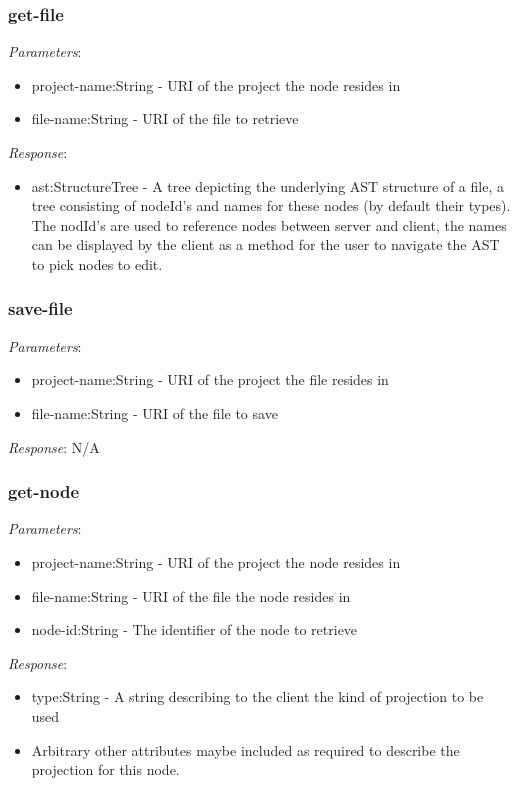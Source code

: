 \documentclass{article}
\begin{document}
\subsubsection{get-file}
\emph{Parameters}: 
\begin{itemize}
\item project-name:String - URI of the project the node resides in
\item file-name:String - URI of the file to retrieve
\end{itemize}
\emph{Response}: 
\begin{itemize}
\item ast:StructureTree - A tree depicting the underlying AST structure of a file, a tree consisting of nodeId's and names for these nodes (by default their types). The nodId's are used to reference nodes between server and client, the names can be displayed by the client as a method for the user to navigate the AST to pick nodes to edit.
\end{itemize}

\subsubsection{save-file}
\emph{Parameters}: 
\begin{itemize}
\item project-name:String - URI of the project the file resides in
\item file-name:String - URI of the file to save
\end{itemize}
\emph{Response}: N/A

\subsubsection{get-node}
\emph{Parameters}: 
\begin{itemize}
\item project-name:String - URI of the project the node resides in
\item file-name:String - URI of the file the node resides in
\item node-id:String - The identifier of the node to retrieve
\end{itemize}
\emph{Response}: 
\begin{itemize}
\item type:String - A string describing to the client the kind of projection to be used
\item Arbitrary other attributes maybe included as required to describe the projection for this node.
\end{itemize}
\end{document}
